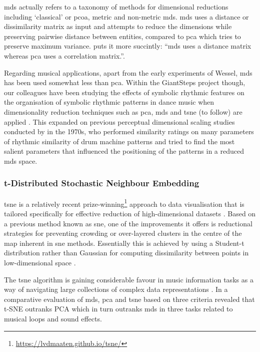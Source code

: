 \acrfull{mds} actually refers to a taxonomy of methods for dimensional reductions including `classical' or \acrfull{pcoa}, metric and non-metric \acrshort{mds}. \acrshort{mds} uses a distance or dissimilarity matrix as input and attempts to reduce the dimensions while preserving pairwise distance between entities, compared to \acrshort{pca} which tries to preserve maximum variance. \cite{frisson2015} puts it more succintly: ``\acrshort{mds} uses a distance matrix whereas \acrshort{pca} uses a correlation matrix.''.

Regarding musical applications, apart from the early experiments of Wessel, \citep{Wessel1976, Wessel1979} \acrshort{mds} has been used somewhat less than \acrshort{pca}. Within the GiantSteps project though, our colleagues have been studying the effects of symbolic rhythmic features on the organisation of symbolic rhythmic patterns in dance music when dimensionality reduction techniques such as \acrshort{pca}, \acrshort{mds} and \acrshort{tsne} (to follow) are applied \citep{Gomez-Marin2017, Gomez-Marin2016}. This expanded on previous perceptual dimensional scaling studies conducted by \cite{Gabrielsson1973a, Gabrielsson1973b} in the 1970s, who performed similarity ratings on  many parameters of rhythmic similarity of drum machine patterns and tried to find the most salient parameters that influenced the positioning of the patterns in a reduced \acrshort{mds} space.

\subsubsection{t-Distributed Stochastic Neighbour Embedding}

\acrfull{tsne} is a relatively recent prize-winning\footnote{\url{https://lvdmaaten.github.io/tsne/}} approach to data visualisation that is tailored specifically for effective reduction of high-dimensional datasets \citep{VanDerMaaten2008}. Based on a previous method known as \acrfull{sne}, one of the improvements it offers is  reductional strategies for preventing crowding or over-layered clusters in the centre of the map inherent in \acrshort{sne} methods. Essentially this is achieved by using a Student-t distribution rather than Gaussian for computing dissimilarity between points in low-dimensional space \citep{VanDerMaaten2008}.

The \acrshort{tsne} algorithm is gaining considerable favour in music information tasks as a way of navigating large collections of complex data representations \citep{Hamel2010, Grill2012, Frisson2014, Frisson2014a, Flexer2015, Martin2017, Font2017}. In a comparative evaluation of \acrshort{mds}, \acrshort{pca} and \acrshort{tsne} based on three criteria \cite{Dupont2013} revealed that t-SNE outranks PCA which in turn outranks \acrshort{mds} in three tasks related to musical loops and sound effects.

